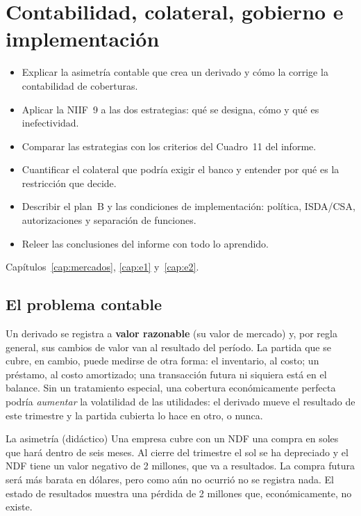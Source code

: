 \chapter{Contabilidad, colateral, gobierno e implementación}\label{cap:niif}

\begin{objetivos}
\begin{itemize}
\item Explicar la asimetría contable que crea un derivado y cómo la corrige la contabilidad de coberturas.
\item Aplicar la NIIF~9 a las dos estrategias: qué se designa, cómo y qué es inefectividad.
\item Comparar las estrategias con los criterios del Cuadro~11 del informe.
\item Cuantificar el colateral que podría exigir el banco y entender por qué es la restricción que decide.
\item Describir el plan~B y las condiciones de implementación: política, ISDA/CSA, autorizaciones y separación de funciones.
\item Releer las conclusiones del informe con todo lo aprendido.
\end{itemize}
\end{objetivos}

\begin{prerreq}Capítulos~\ref{cap:mercados}, \ref{cap:e1} y~\ref{cap:e2}.\end{prerreq}

\section{El problema contable}

Un derivado se registra a \textbf{valor razonable} (su valor de mercado) y, por regla general, sus cambios de valor van al resultado del período. La partida que se cubre, en cambio, puede medirse de otra forma: el inventario, al costo; un préstamo, al costo amortizado; una transacción futura ni siquiera está en el balance. Sin un tratamiento especial, una cobertura económicamente perfecta podría \emph{aumentar} la volatilidad de las utilidades: el derivado mueve el resultado de este trimestre y la partida cubierta lo hace en otro, o nunca.

\begin{ejemplo}{La asimetría (didáctico)}
Una empresa cubre con un NDF una compra en soles que hará dentro de seis meses. Al cierre del trimestre el sol se ha depreciado y el NDF tiene un valor negativo de 2 millones, que va a resultados. La compra futura será más barata en dólares, pero como aún no ocurrió no se registra nada. El estado de resultados muestra una pérdida de 2 millones que, económicamente, no existe.
\end{ejemplo}

